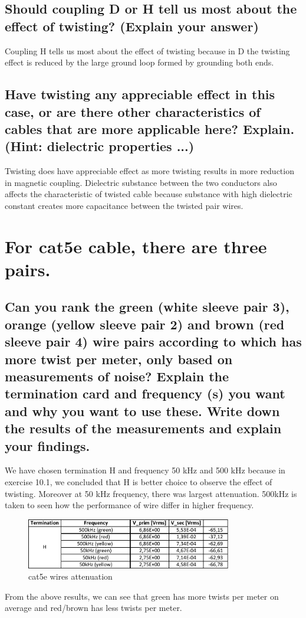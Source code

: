 \documentclass[12pt,a4paper,UKenglish]{article}
\begin{document}
\subsection{Should coupling D or H tell us most about the effect of twisting? (Explain your answer)}
Coupling H tells us most about the effect of twisting because in D the twisting effect is reduced by the large ground loop formed by grounding both ends.
\subsection{Have twisting any appreciable effect in this case, or are there other characteristics of cables that are more applicable here? Explain. (Hint: dielectric properties ...)}
Twisting does have appreciable effect as more twisting results in more reduction in magnetic coupling. Dielectric substance between the two conductors also affects the characteristic of twisted cable because substance with high dielectric constant creates more capacitance between the twisted pair wires.

\section{For cat5e cable, there are three pairs.}
\subsection{Can you rank the green (white sleeve  pair 3), orange (yellow sleeve pair 2) and brown (red sleeve  pair 4) wire pairs according to which has more twist per meter, only based on measurements of noise? Explain the termination card and frequency (s) you want and why you want to use these. Write down the results of the  measurements and explain your findings.}
We have chosen termination H and frequency 50 kHz and 500 kHz because in exercise 10.1, we concluded that H is better choice to observe the effect of twisting. Moreover at 50 kHz frequency, there was largest attenuation. 500kHz is taken to seen how the performance of wire differ in higher frequency. 

\begin{figure} [H] %
  \centering 
  \includegraphics[width=0.8\textwidth]{img/task11a_data.pdf} 
  \caption{cat5e wires attenuation}
  \label{fig:task11a} 
\end{figure}
From the above results, we can see that green has more twists per meter on average and red/brown has less twists per meter.
\end{document}
